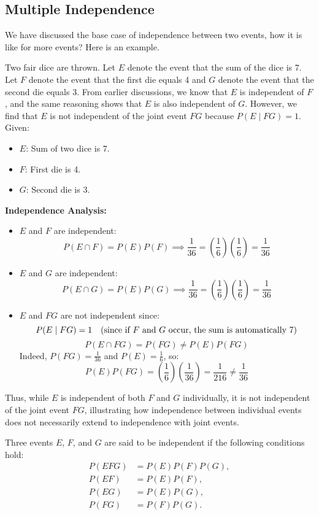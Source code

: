     \subsection{Multiple Independence}
    We have discussed the base case of independence between two events, how it is like for more events? Here is an example.
    \begin{example}
        Two fair dice are thrown. Let \( E \) denote the event that the sum of the dice is 7. Let \( F \) denote the event that the first die equals 4 and \( G \) denote the event that the second die equals 3. From earlier discussions, we know that \( E \) is independent of \( F \), and the same reasoning shows that \( E \) is also independent of \( G \). However, we find that \( E \) is not independent of the joint event \( FG \) because \( P(E \mid FG) = 1 \).
Given:
\begin{itemize}
    \item \( E \): Sum of two dice is 7.
    \item \( F \): First die is 4.
    \item \( G \): Second die is 3.
\end{itemize}
\begin{solution}
    \textbf{Independence Analysis:}
\begin{itemize}
    \item \( E \) and \( F \) are independent:
    \[
    P(E \cap F) = P(E)P(F) \implies \frac{1}{36} = \left(\frac{1}{6}\right)\left(\frac{1}{6}\right) = \frac{1}{36}
    \]
    \item \( E \) and \( G \) are independent:
    \[
    P(E \cap G) = P(E)P(G) \implies \frac{1}{36} = \left(\frac{1}{6}\right)\left(\frac{1}{6}\right) = \frac{1}{36}
    \]
    \item \( E \) and \( FG \) are not independent since:
    \[
    P(E \mid FG) = 1 \quad (\text{since if \( F \) and \( G \) occur, the sum is automatically 7})
    \]
    \[
    P(E \cap FG) = P(FG) \neq P(E)P(FG)
    \]
    Indeed, \( P(FG) = \frac{1}{36} \) and \( P(E) = \frac{1}{6} \), so:
    \[
    P(E)P(FG) = \left(\frac{1}{6}\right)\left(\frac{1}{36}\right) = \frac{1}{216} \neq \frac{1}{36}
    \]
\end{itemize}

Thus, while \( E \) is independent of both \( F \) and \( G \) individually, it is not independent of the joint event \( FG \), illustrating how independence between individual events does not necessarily extend to independence with joint events.
\end{solution}
    \end{example}
    \begin{definition}
        Three events \(E\), \(F\), and \(G\) are said to be independent if the following conditions hold:
        \begin{align*}
        P(EFG) &= P(E)P(F)P(G), \\
        P(EF) &= P(E)P(F), \\
        P(EG) &= P(E)P(G), \\
        P(FG) &= P(F)P(G).
        \end{align*}
        \end{definition}

